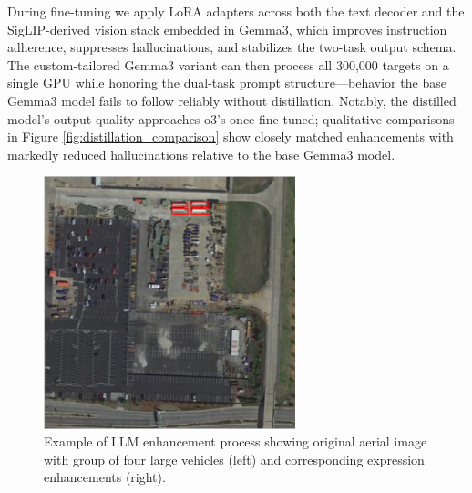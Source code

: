 \documentclass[journal]{IEEEtran}
\begin{document}
During fine-tuning we apply LoRA adapters across both the text decoder and the SigLIP-derived vision stack embedded in Gemma3, which improves instruction adherence, suppresses hallucinations, and stabilizes the two-task output schema. The custom-tailored Gemma3 variant can then process all 300,000 targets on a single GPU while honoring the dual-task prompt structure—behavior the base Gemma3 model fails to follow reliably without distillation. Notably, the distilled model’s output quality approaches o3’s once fine-tuned; qualitative comparisons in Figure \ref{fig:distillation_comparison} show closely matched enhancements with markedly reduced hallucinations relative to the base Gemma3 model.

\begin{figure}[t]
\centering
\begin{minipage}{0.5\textwidth}
\centering
\includegraphics[width=0.65\textwidth]{./images/example_group.png}
\end{minipage}%
\begin{minipage}{0.5\textwidth}
\centering
\hspace{-1cm}
\end{minipage}
\caption{Example of LLM enhancement process showing original aerial image with group of four large vehicles (left) and corresponding expression enhancements (right).}
\label{fig:llm_enhancement_example}
\end{figure}
\end{document}
